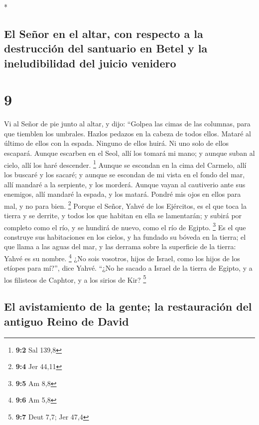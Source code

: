 \begin{paracol}{2}
\switchcolumn[0]*

\hypertarget{el-seuxf1or-en-el-altar-con-respecto-a-la-destrucciuxf3n-del-santuario-en-betel-y-la-ineludibilidad-del-juicio-venidero}{%
\subsection{El Señor en el altar, con respecto a la destrucción del
santuario en Betel y la ineludibilidad del juicio
venidero}\label{el-seuxf1or-en-el-altar-con-respecto-a-la-destrucciuxf3n-del-santuario-en-betel-y-la-ineludibilidad-del-juicio-venidero}}

\hypertarget{section-16}{%
\section{9}\label{section-16}}

 Vi al Señor de pie junto al altar, y dijo: ``Golpea las
cimas de las columnas, para que tiemblen los umbrales. Hazlos pedazos en
la cabeza de todos ellos. Mataré al último de ellos con la espada.
Ninguno de ellos huirá. Ni uno solo de ellos escapará. 
Aunque escarben en el Seol, allí los tomará mi mano; y aunque suban al
cielo, allí los haré descender. \footnote{\textbf{9:2} Sal 139,8}
 Aunque se escondan en la cima del Carmelo, allí los
buscaré y los sacaré; y aunque se escondan de mi vista en el fondo del
mar, allí mandaré a la serpiente, y los morderá.  Aunque
vayan al cautiverio ante sus enemigos, allí mandaré la espada, y los
matará. Pondré mis ojos en ellos para mal, y no para bien. \footnote{\textbf{9:4}
  Jer 44,11}  Porque el Señor, Yahvé de los Ejércitos, es
el que toca la tierra y se derrite, y todos los que habitan en ella se
lamentarán; y subirá por completo como el río, y se hundirá de nuevo,
como el río de Egipto. \footnote{\textbf{9:5} Am 8,8}  Es
el que construye sus habitaciones en los cielos, y ha fundado su bóveda
en la tierra; el que llama a las aguas del mar, y las derrama sobre la
superficie de la tierra: Yahvé es su nombre. \footnote{\textbf{9:6} Am
  5,8}  ¿No sois vosotros, hijos de Israel, como los hijos
de los etíopes para mí?'', dice Yahvé. ``¿No he sacado a Israel de la
tierra de Egipto, y a los filisteos de Caphtor, y a los sirios de Kir?
\footnote{\textbf{9:7} Deut 7,7; Jer 47,4}

\hypertarget{el-avistamiento-de-la-gente-la-restauraciuxf3n-del-antiguo-reino-de-david}{%
\subsection{El avistamiento de la gente; la restauración del antiguo
Reino de
David}\label{el-avistamiento-de-la-gente-la-restauraciuxf3n-del-antiguo-reino-de-david}}


\end{paracol}
